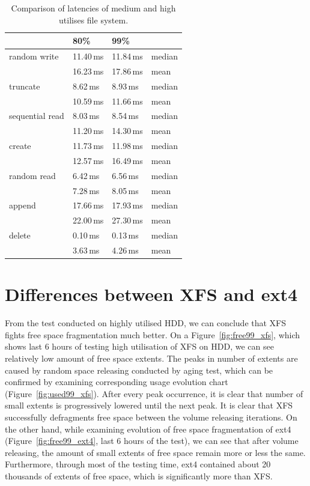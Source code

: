 \documentclass[
  color, %
  table, %
  lof,   %
  lot,   %
]{fithesis3}
\begin{document}
\begin{table}
\centering
\begin{tabular}{|l|l|l|l|}
\hline
 &80\% & 99\% &  \\
\hline
    random write & 11.40\,ms & 11.84\,ms & median \\
 \hline
                 & 16.23\,ms & 17.86\,ms& mean\\
    \hline
        truncate & 8.62\,ms & 8.93\,ms & median\\
    \hline
                 &  10.59\,ms & 11.66\,ms & mean \\
    \hline
           sequential read &  8.03\,ms & 8.54\,ms & median\\
    \hline
                 & 11.20\,ms & 14.30\,ms & mean \\
    \hline
          create & 11.73\,ms & 11.98\,ms & median\\
    \hline
                 & 12.57\,ms & 16.49\,ms & mean \\
    \hline
     random read & 6.42\,ms &6.56\,ms& median\\
    \hline
                 & 7.28\,ms & 8.05\,ms & mean \\
    \hline
          append & 17.66\,ms & 17.93\,ms & median\\
    \hline
                 & 22.00\,ms & 27.30\,ms & mean \\
    \hline
          delete & 0.10\,ms & 0.13\,ms & median\\
    \hline
                & 3.63\,ms & 4.26\,ms & mean \\
    \hline
\end{tabular}
\caption{Comparison of latencies of medium and high utilises file system.}
\label{tab:99_vs_80}
\end{table}


\section{Differences between XFS and ext4}
From the test conducted on highly utilised  HDD, we can conclude that  XFS fights free space fragmentation much better. On a Figure~\ref{fig:free99_xfs}, which shows last 6 hours of testing high utilisation of XFS on HDD, we can see relatively low amount of free space extents. The peaks in number of extents are caused by random space releasing conducted by aging test, which can be confirmed by examining corresponding usage evolution chart (Figure~\ref{fig:used99_xfs}). After every peak occurrence, it is clear that number of small extents is progressively lowered until the next peak. It is clear that XFS successfully defragments free space between the volume releasing iterations. On the other hand, while examining evolution of free space fragmentation of ext4 (Figure~\ref{fig:free99_ext4}, last 6 hours of the test), we can see that after volume releasing, the amount of small extents of free space remain more or less the same. Furthermore, through most of the testing time, ext4 contained about 20 thousands of extents of free space, which is significantly more than XFS.
\end{document}
